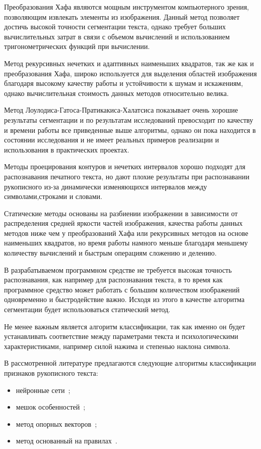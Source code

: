 Преобразования Хафа являются мощным инструментом компьютерного зрения, позволяющим извлекать элементы из изображения. Данный метод позволяет достичь высокой точности сегментации текста, однако требует больших вычислительных затрат в связи с объемом вычислений и использованием тригонометрических функций при вычислении.

Метод рекурсивных нечетких и адаптивных наименьших квадратов, так же как и преобразования Хафа, широко используется для выделения областей изображения благодаря высокому качеству работы и устойчивости к шумам и искажениям, однако вычислительная стоимость данных методов относительно велика.

Метод Лоулодиса-Гатоса-Пратикакиса-Халатсиса показывает очень хорошие результаты сегментации и по результатам исследований превосходит по качеству и времени работы все приведенные выше алгоритмы, однако он пока находится в состоянии исследования и не имеет реальных примеров реализации и использования в практических проектах.

Методы проецирования контуров и нечетких интервалов хорошо подходят для распознавания печатного текста, но дают плохие результаты при распознавании рукописного из-за динамически изменяющихся интервалов между символами,строками и словами.

Статические методы основаны на разбиении изображении в зависимости от распределения средней яркости частей изображения, качества работы данных методов ниже чем у преобразований Хафа или рекурсивных методов на основе наименьших квадратов, но время работы намного меньше благодаря меньшему количеству вычислений и быстрым операциям сложению и делению.

В разрабатываемом программном средстве не требуется высокая точность распознавания, как например для распознавания текста, в то время как программное средство может работать с большим количеством изображений одновременно и быстродействие важно. Исходя из этого в качестве алгоритма сегментации будет использоваться статический метод.

Не менее важным является алгоритм классификации, так как именно он будет устанавливать соответствие между параметрами текста и психологическими характеристиками, например силой нажима и степенью наклона символа.

В рассмотренной литературе предлагаются следующие алгоритмы классификации признаков рукописного текста:
\begin{itemize}
  \item нейронные сети~\cite{champa_ananda_kumar_ann, grewal_prashar, gabrani_solomon_dviwe,puri_lakhwani, dang_kumar, kathait_singh};
  \item мешок особенностей~\cite{rothacker_bag_of_features};
  \item метод опорных векторов~\cite{slideshare_khandelwal_garg, gabrani_solomon_dviwe, prasad_singh_sapre};
  \item метод основанный на правилах~\cite{champa_ananda_kumar_rule_base}.
\end{itemize}

